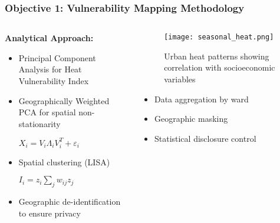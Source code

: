 \documentclass[aspectratio=169]{beamer}
\begin{document}
\begin{frame}
    \frametitle{Objective 1: Vulnerability Mapping Methodology}
    
    \begin{columns}[T]
        \begin{column}{0.55\textwidth}
            \textbf{\large Analytical Approach:}
            \begin{itemize}[leftmargin=*, itemsep=6pt]
                \item Principal Component Analysis for Heat Vulnerability Index
                \item Geographically Weighted PCA for spatial non-stationarity
                
                $X_i = V_i \Lambda_i V_i^T + \varepsilon_i$
                
                \item Spatial clustering (LISA)
                
                $I_i = z_i\sum_{j}w_{ij}z_j$
                
                \item Geographic de-identification to ensure privacy
            \end{itemize}
        \end{column}
        \begin{column}{0.42\textwidth}
            \begin{figure}
                \texttt{[image: seasonal\_heat.png]}
                \caption{\small Urban heat patterns showing correlation with socioeconomic variables}
            \end{figure}
            
            \begin{infobox}
                \begin{itemize}[leftmargin=*, itemsep=4pt]
                    \item Data aggregation by ward
                    \item Geographic masking
                    \item Statistical disclosure control
                \end{itemize}
            \end{infobox}
        \end{column}
    \end{columns}
\end{frame}
\end{document}
